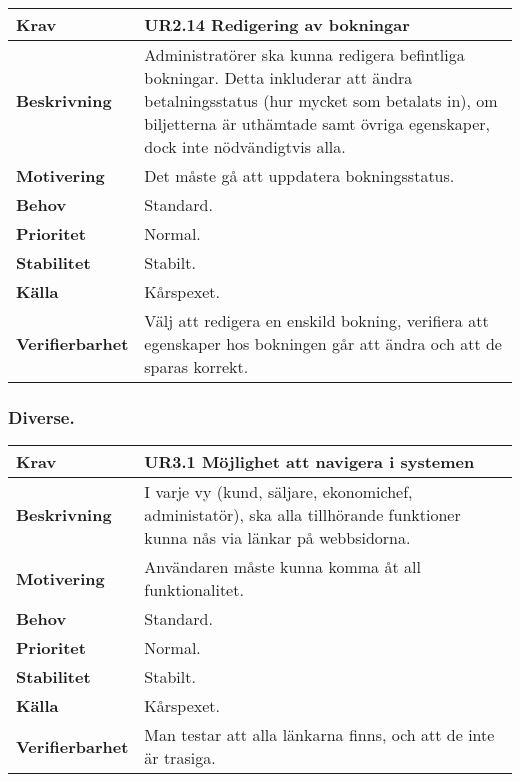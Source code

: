 \documentclass[a4paper, twoside, 11pt, titlepage]{article}
\begin{document}
		\begin{tabular} { p{2.6cm} p{12.5cm} }
			\hline
			\sffamily\textbf{Krav} & \sffamily\textbf{UR2.14 Redigering av bokningar  } \\
			\hline
			\sffamily\textbf{Beskrivning} & Administratörer ska kunna redigera befintliga bokningar. Detta inkluderar att ändra betalningsstatus (hur mycket som betalats in), om biljetterna är uthämtade samt övriga egenskaper, dock inte nödvändigtvis alla.  \\
			\hline
			\sffamily\textbf{Motivering} & Det måste gå att uppdatera bokningsstatus.  \\
			\hline
			\sffamily\textbf{Behov} & Standard.  \\
			\hline
			\sffamily\textbf{Prioritet} & Normal.  \\
			\hline
			\sffamily\textbf{Stabilitet} & Stabilt.  \\
			\hline
			\sffamily\textbf{Källa} & Kårspexet.  \\
			\hline
			\sffamily\textbf{Verifierbarhet} & Välj att redigera en enskild bokning, verifiera att egenskaper hos bokningen går att ändra och att de sparas korrekt.  \\
			\hline
		\end{tabular}


		\subsubsection{Diverse.}


		\begin{tabular} { p{2.6cm} p{12.5cm} }
			\hline
			\sffamily\textbf{Krav} & \sffamily\textbf{UR3.1 Möjlighet att navigera i systemen  } \\
			\hline
			\sffamily\textbf{Beskrivning} & I varje vy (kund, säljare, ekonomichef, administatör), ska alla tillhörande funktioner kunna nås via länkar på webbsidorna.  \\
			\hline
			\sffamily\textbf{Motivering} & Användaren måste kunna komma åt all funktionalitet.  \\
			\hline
			\sffamily\textbf{Behov} & Standard.  \\
			\hline
			\sffamily\textbf{Prioritet} & Normal.  \\
			\hline
			\sffamily\textbf{Stabilitet} & Stabilt.  \\
			\hline
			\sffamily\textbf{Källa} & Kårspexet.  \\
			\hline
			\sffamily\textbf{Verifierbarhet} & Man testar att alla länkarna finns, och att de inte är trasiga.  \\
			\hline
		\end{tabular}
		\vspace{6mm}
\end{document}
